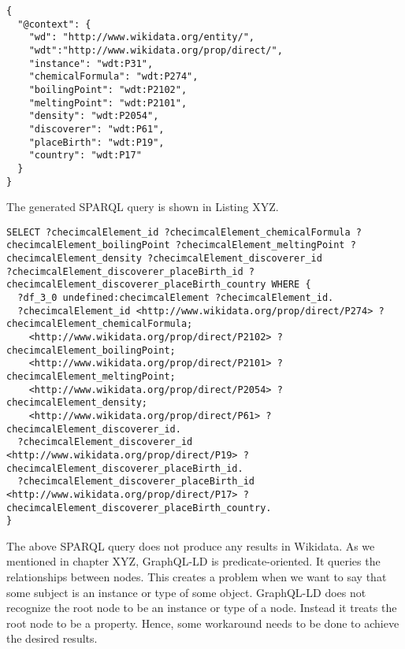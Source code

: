 \begin{minipage}{\linewidth}
\begin{lstlisting}[label=listing:listing18, caption={JSON-LD Context}]
{
  "@context": {
    "wd": "http://www.wikidata.org/entity/",
    "wdt":"http://www.wikidata.org/prop/direct/",
    "instance": "wdt:P31",
    "chemicalFormula": "wdt:P274",
    "boilingPoint": "wdt:P2102",
    "meltingPoint": "wdt:P2101",
    "density": "wdt:P2054",
    "discoverer": "wdt:P61",
    "placeBirth": "wdt:P19",
    "country": "wdt:P17"
  }
}
\end{lstlisting}
\end{minipage}

The generated SPARQL query is shown in Listing XYZ. 

\begin{minipage}{\linewidth}
\begin{lstlisting}[label=listing:listing19, caption={Generated SPARQL Query}]
SELECT ?checimcalElement_id ?checimcalElement_chemicalFormula ?checimcalElement_boilingPoint ?checimcalElement_meltingPoint ?checimcalElement_density ?checimcalElement_discoverer_id 
?checimcalElement_discoverer_placeBirth_id ?checimcalElement_discoverer_placeBirth_country WHERE {
  ?df_3_0 undefined:checimcalElement ?checimcalElement_id.
  ?checimcalElement_id <http://www.wikidata.org/prop/direct/P274> ?checimcalElement_chemicalFormula;
    <http://www.wikidata.org/prop/direct/P2102> ?checimcalElement_boilingPoint;
    <http://www.wikidata.org/prop/direct/P2101> ?checimcalElement_meltingPoint;
    <http://www.wikidata.org/prop/direct/P2054> ?checimcalElement_density;
    <http://www.wikidata.org/prop/direct/P61> ?checimcalElement_discoverer_id.
  ?checimcalElement_discoverer_id <http://www.wikidata.org/prop/direct/P19> ?checimcalElement_discoverer_placeBirth_id.
  ?checimcalElement_discoverer_placeBirth_id <http://www.wikidata.org/prop/direct/P17> ?checimcalElement_discoverer_placeBirth_country.
}
\end{lstlisting}
\end{minipage}

The above SPARQL query does not produce any results in Wikidata. As we mentioned in chapter XYZ, GraphQL-LD is predicate-oriented. It queries the relationships between nodes. This creates a problem when we want to say that some subject is an instance or type of some object. GraphQL-LD does not recognize the root node to be an instance or type of a node. Instead it treats the root node to be a property. Hence, some workaround needs to be done to achieve the desired results.

